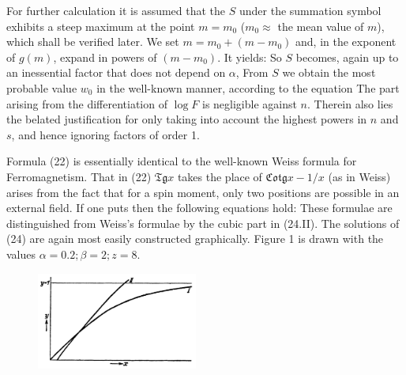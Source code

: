 \begin{paper}{1}
For further calculation it is assumed that the $S$ under the summation symbol exhibits a steep maximum at the point $m=m_0$ ($m_0 \approx$ the mean value of $m$), which shall be verified later. We set $m=m_0 + (m-m_0)$ and, in the exponent of $g(m)$, expand in powers of $(m-m_0)$. It yields:
So $S$ becomes, again up to an inessential factor that does not depend on $\alpha$,
From $S$ we obtain the most probable value $w_0$ in the well-known manner, according to the equation
The part arising from the differentiation of $\log{F}$ is negligible against $n$. Therein also lies the belated justification for only taking into account the highest powers in $n$ and $s$, and hence ignoring factors of order 1.

Formula (22) is essentially identical to the well-known Weiss formula for Ferromagnetism. That in (22) $\mathfrak{Tg}x$ takes the place of $\mathfrak{Cotg}x-1/x$ (as in Weiss) arises from the fact that for a spin moment, only two positions are possible in an external field. If one puts
then the following equations hold:
These formulae are distinguished from Weiss's formulae by the cubic part in (24.II). The solutions of (24) are again most easily constructed graphically. Figure 1 is drawn with the values $\alpha=0.2; \beta=2; z=8$.
\begin{figure}[h]
	\begin{center}
		\includegraphics[width=150pt]{fig1}
	\end{center}
\end{figure}


\end{paper}
